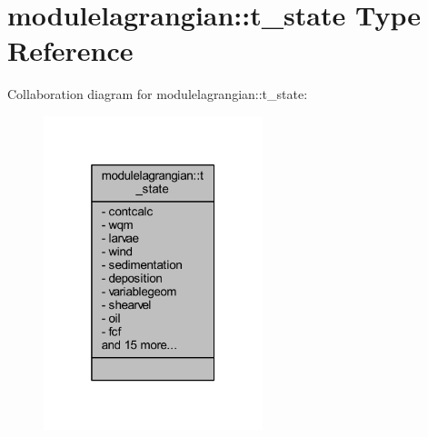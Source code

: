 \hypertarget{structmodulelagrangian_1_1t__state}{}\section{modulelagrangian\+:\+:t\+\_\+state Type Reference}
\label{structmodulelagrangian_1_1t__state}


Collaboration diagram for modulelagrangian\+:\+:t\+\_\+state\+:\nopagebreak
\begin{figure}[H]
\begin{center}
\leavevmode
\includegraphics[width=181pt]{structmodulelagrangian_1_1t__state__coll__graph}
\end{center}
\end{figure}
